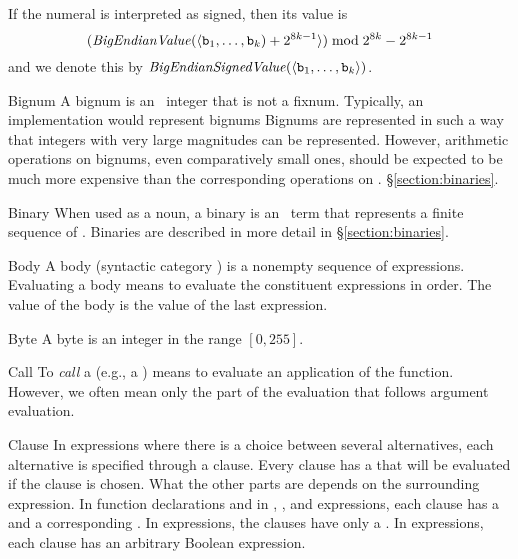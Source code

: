 \begin{Lentry}
If the numeral is interpreted as signed, then its value is
\[({\it BigEndianValue}(\langle{\tt{\sl b}}_1, \ldots, {\tt{\sl b}}_k)+2^{8k-1}\rangle) \bmod 2^{8k} - 2^{8k-1}\]
and we denote this by
${\it BigEndianSignedValue}(\langle{\tt{\sl b}}_1, \ldots, {\tt{\sl b}}_k\rangle)$.

\item[Bignum]
A bignum is an \Erlang\ integer that is not a fixnum.
\ifStd Typically, an implementation would represent bignums
\else Bignums are represented \fi
in such a way that integers with very large magnitudes can be
represented.  However, arithmetic operations on bignums, even
comparatively small ones, should be expected to be much more expensive
than the corresponding operations on .
\S\ref{section:binaries}.

\item[Binary]
When used as a noun, a binary is an \Erlang\ term that represents a
finite sequence of .  Binaries are described in more detail
in \S\ref{section:binaries}.

\item[Body]
A body (syntactic category ) is a nonempty sequence of
expressions.  Evaluating a body means to evaluate the constituent
expressions in order.  The value of the body is the value of the last
expression.

\item[Byte]
A byte is an integer in the range $[0,255]$.

\item[Call]
To \emph{call} a  (e.g., a ) means to evaluate an
application of the function.  However, we often mean only the part of
the evaluation that follows argument evaluation.

\item[Clause]
In expressions where there is a choice between several alternatives,
each alternative is specified through a clause.  Every clause has a
 that will be evaluated if the clause is chosen. What the
other parts are depends on the surrounding expression.  In function
declarations and in , ,  and 
expressions, each clause has a  and a corresponding
.  In  expressions, the clauses have only a .
\ifStd
In  expressions, each clause has an arbitrary Boolean
expression.
\fi
{}


\end{Lentry}
